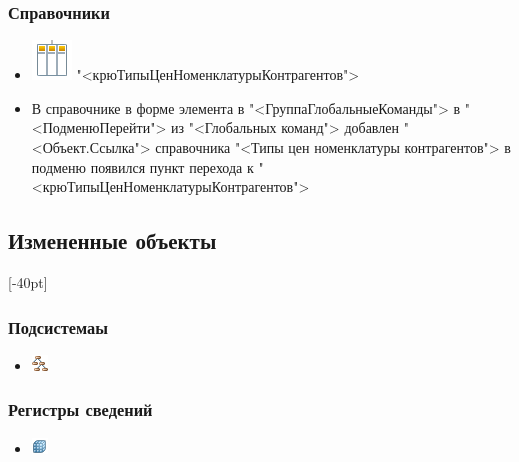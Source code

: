 \subsubsection{Справочники}
\begin{itemize}	
    \item \includegraphics[width=0.02\linewidth]{images/sp}
    "<крюТипыЦенНоменклатурыКонтрагентов">

    \item В справочнике в форме элемента  в  "<ГруппаГлобальныеКоманды">  в "<ПодменюПерейти">  из "<Глобальных команд"> добавлен "<Объект.Ссылка"> справочника "<Типы цен номенклатуры контрагентов"> в подменю появился пункт перехода к "<крюТипыЦенНоменклатурыКонтрагентов">
    
\end{itemize}


\subsection{Измененные объекты}
[-40pt]

\subsubsection{Подсистемаы}
\begin{itemize}	
	\item \includegraphics[width=0.02\linewidth]{images/ps}
\end{itemize}
\subsubsection{Регистры сведений}
\begin{itemize}\item 	\includegraphics[width=0.02\linewidth]{images/rs}
\end{itemize}

